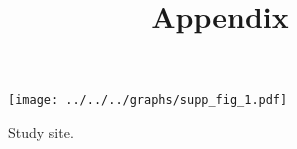 \documentclass[12pt,a4paper]{scrartcl}
\title{Appendix}
\date{}
\begin{document}
    \maketitle
    
     \begin{figure}[h]
         \centering
         \texttt{[image: ../../../graphs/supp\_fig\_1.pdf]}
         \caption{Study site.}
     \end{figure}
    
    \clearpage
    \newpage

    
\end{document}

